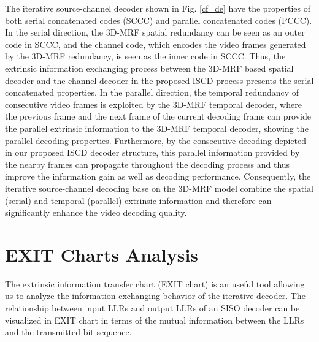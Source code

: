 \documentclass[10pt,twocolumn,twoside]{IEEEtran}
\begin{document}
The iterative source-channel decoder shown in Fig. \ref{cf_de} have the properties of both serial concatenated codes (SCCC) and parallel concatenated codes (PCCC). In the serial direction, the 3D-MRF spatial redundancy can be seen as an outer code in SCCC, and the channel code, which encodes the video frames generated by the 3D-MRF redundancy, is seen as the inner code in SCCC. Thus, the extrinsic information exchanging process between the 3D-MRF based spatial decoder and the channel decoder in the proposed ISCD process presents the serial concatenated properties. In the parallel direction, the temporal redundancy of consecutive video frames is exploited by the 3D-MRF temporal decoder, where the previous frame and the next frame of the current decoding frame can provide the parallel extrinsic information to the 3D-MRF temporal decoder, showing the parallel decoding properties. Furthermore, by the consecutive decoding depicted in our proposed ISCD decoder structure, this parallel information provided by the nearby frames can propagate throughout the decoding process and thus improve the information gain as well as decoding performance. Consequently, the iterative source-channel decoding base on the 3D-MRF model combine the spatial (serial) and temporal (parallel) extrinsic information and therefore can significantly enhance the video decoding quality. 

\section{EXIT Charts Analysis}\label{sec_exit}

The extrinsic information transfer chart (EXIT chart) \cite{exit} is an useful tool allowing us to analyze the information exchanging behavior of the iterative decoder. The relationship between input LLRs and output LLRs of an SISO decoder can be visualized in EXIT chart in terms of the mutual information between the LLRs and the transmitted bit sequence. 
\end{document}
